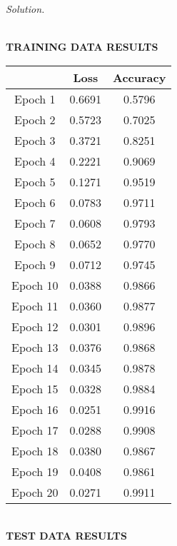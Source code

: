 \documentclass[12pt]{article}
\newcommand\sol[1]{\begin{mdframed}
\emph{Solution.} #1
\end{mdframed}}
\begin{document}
\begin{enumerate}
\begin{itemize}
\end{itemize}



\sol{
\begin{center}
  \textbf{\\TRAINING DATA RESULTS}  
\end{center}

\begin{center}
\begin{tabular}{||c c c ||} 
 \hline
       & Loss & Accuracy \\ [0.5ex] 
 \hline\hline
 Epoch 1  & 0.6691 & 0.5796 \\ 
 \hline
 Epoch 2 & 0.5723 & 0.7025 \\
 \hline
 Epoch 3   & 0.3721  & 0.8251\\
 \hline
 Epoch 4  & 0.2221 & 0.9069\\
 \hline
 Epoch 5  & 0.1271 & 0.9519 \\ 
 \hline
 Epoch 6 & 0.0783 & 0.9711 \\
 \hline
 Epoch 7  & 0.0608  & 0.9793 \\
 \hline
 Epoch 8  & 0.0652 & 0.9770  \\
 \hline
 Epoch 9  & 0.0712  & 0.9745 \\ 
 \hline
 Epoch 10 & 0.0388 & 0.9866   \\
 \hline
 Epoch 11   & 0.0360 & 0.9877  \\
 \hline
 Epoch 12  & 0.0301 & 0.9896  \\
 \hline
 Epoch 13  & 0.0376 & 0.9868  \\
 \hline
 Epoch 14 & 0.0345 & 0.9878 \\ 
 \hline
 Epoch 15 & 0.0328 & 0.9884  \\
 \hline
 Epoch 16   & 0.0251 & 0.9916  \\
 \hline
 Epoch 17  & 0.0288 & 0.9908   \\
 \hline
 Epoch 18  & 0.0380 & 0.9867 \\
 \hline
 Epoch 19  & 0.0408 & 0.9861 \\
 \hline
  Epoch 20  & 0.0271 & 0.9911  \\
 \hline

\end{tabular}
\end{center}


\begin{center}
  \textbf{\\TEST DATA RESULTS}  
\end{center}

}
\end{enumerate}
\end{document}
